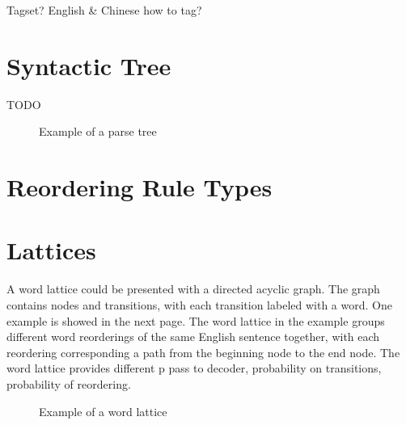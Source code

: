 Tagset? English \& Chinese how to tag?


\label{ch:Foundations:sec:PosTag}

\section{Syntactic Tree}
\label{ch:Foundations:sec:SyntacticTree}

TODO

\begin{figure}[H]
\centering

\caption{Example of a parse tree}
\end{figure}


\section{Reordering Rule Types}
\label{ch:Foundations:sec:types}



\section{Lattices}
\label{ch:Foundations:sec:Lattices}
A word lattice could be presented with a directed acyclic graph. The graph contains nodes and transitions, with each transition labeled with a word. One example is showed in the next page. The word lattice in the example groups different word reorderings of the same English sentence together, with each reordering corresponding a path from the beginning node to the end node. The word lattice provides different p 
pass to decoder,
probability on transitions,
probability of reordering.

\begin{landscape}
\begin{figure}
\centering

\caption{Example of a word lattice}
\end{figure}
\end{landscape}


